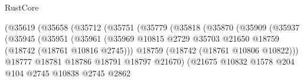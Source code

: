 \begin{lexlean}{RustCore}
\begin{coremodule}
                                            (@35619
                                              (@35658
                                                (@35712
                                                  (@35751
                                                    (@35779
                                                      (@35818
                                                        (@35870
                                                          (@35909
                                                            (@35937
                                                              (@35945
                                                                (@35951
                                                                  (@35961
                                                                    (@35969
                                                                      @10815
                                                                      @2729
                                                                      @35703
                                                                      @21650
                                                                      @18759
                                                                      (@18742
                                                                        (@18761 @10816 @2745)))
                                                                    @18759
                                                                    (@18742 (@18761 @10806 @10822)))
                                                                  @18777
                                                                  @18781
                                                                  @18786
                                                                  @18791
                                                                  @18797
                                                                  @21670)
                                                                (@21675
                                                                  @10832
                                                                  @1578
                                                                  @204
                                                                  @104
                                                                  @2745
                                                                  @10838
                                                                  @2745
                                                                  @2862

\end{coremodule}
\end{lexlean}
